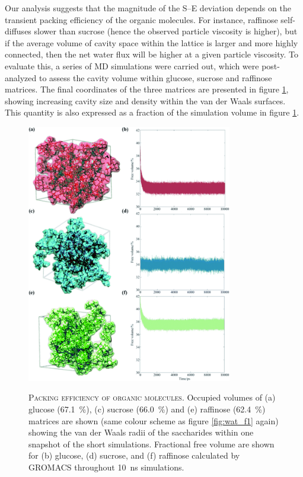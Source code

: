 Our analysis suggests that the magnitude of the S–E deviation depends on the transient packing efficiency of the organic molecules. For instance, raffinose self-diffuses slower than sucrose (hence the observed particle viscosity is higher), but if the average volume of cavity space within the lattice is larger and more highly connected, then the net water flux will be higher at a given particle viscosity. To evaluate this,  a series of MD simulations were carried out, which were post-analyzed to assess the cavity volume within glucose, sucrose and raffinose matrices. The final coordinates of the three matrices are presented in figure \ref{fig:wat_packing_eff}, showing increasing cavity size and density within the van der Waals surfaces. This quantity is also expressed as a fraction of the simulation volume in figure \ref{fig:wat_packing_eff}.

\begin{figure}
    \centering
    \caption[Packing efficiency of organic molecules]{\textsc{Packing efficiency of organic molecules}. Occupied volumes of (a) glucose (\SI{67.1}{\percent}), (c) sucrose (\SI{66.0}{\percent}) and (e) raffinose (\SI{62.4}{\percent}) matrices are shown (same colour scheme as figure \ref{fig:wat_f1} again) showing the van der Waals radii of the saccharides within one snapshot of the short simulations. Fractional free volume are shown for (b) glucose, (d) sucrose, and (f) raffinose calculated by GROMACS throughout \SI{10}{\nano\second} simulations.}
    \includegraphics[width=0.8\textwidth]{chapters/water_hopping/figures/f5.png}
    \label{fig:wat_packing_eff}
\end{figure}

